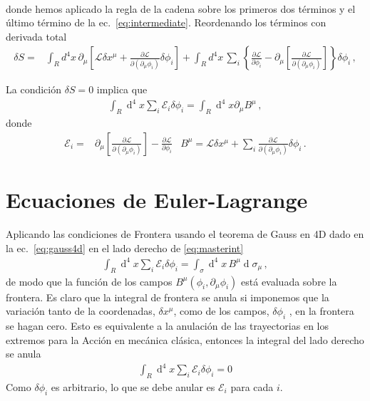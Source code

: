 \begin{frame}
\begin{align}
\end{align}
donde hemos aplicado la regla de la cadena sobre los primeros dos términos y el último término de la ec.~\eqref{eq:intermediate}.
Reordenando los términos con derivada total
\begin{align}
  \delta S =&
\int_{R} d^4x\,\partial_{\mu} \left[\mathcal{L} \delta x^{\mu} + \frac{\partial\mathcal{L}}{\partial(\partial_{\mu}\phi_i)}\delta\phi_{i} \right]  + \int_{R}d^4x\,\sum_i \left\{ \frac{\partial\mathcal{L}}{\partial\phi_i} -\partial_{\mu} \left[ \frac{\partial\mathcal{L}}{\partial(\partial_{\mu}\phi_i)}\right]  \right\}\delta\phi_{i}\,,              
\end{align}
\end{frame}

\begin{frame}
La condición $\delta S=0$ implica que
\begin{align}
\label{eq:masterint}
\int_R \operatorname{d}^4x  \sum_i \mathcal{E}_i \delta\phi_i =\int_R \operatorname{d}^4x  \partial_{\mu} B^{\mu}\,,
\end{align}
donde
\begin{align}
\label{eq:master2}
  \mathcal{E}_i=&\partial_{\mu} \left[ \frac{\partial\mathcal{L}}{\partial(\partial_{\mu}\phi_i)}\right]-\frac{\partial\mathcal{L}}{\partial\phi_i} & B^{\mu}=\mathcal{L} \delta x^{\mu} +\sum_i \frac{\partial\mathcal{L}}{\partial(\partial_{\mu}\phi_i)}\delta\phi_{i}\,. 
\end{align}
\end{frame}


\section{Ecuaciones de Euler-Lagrange}


Aplicando las condiciones de Frontera usando  el teorema de Gauss en 4D dado en la ec.~\eqref{eq:gauss4d} en el lado derecho de \eqref{eq:masterint}
\begin{align}
\int_R \operatorname{d}^4x  \sum_i \mathcal{E}_i \delta\phi_i =\int_\sigma \operatorname{d}^4x \, B^{\mu}\operatorname{d}\sigma_{\mu}\,,
\end{align}
de modo que la función de los campos $B^{\mu}(\phi_i,\partial_{\mu} \phi_{i})$ está evaluada sobre la frontera.
Es claro que la integral de frontera se anula si imponemos que la variación tanto de la coordenadas, $\delta x^{\mu}$, como de los campos, $\delta \phi_{i}$ , en la frontera se hagan cero. Esto es equivalente a la anulación de las trayectorias en los extremos para la Acción en mecánica clásica, 
entonces la integral del lado derecho se anula 
\begin{align}
\int_R \operatorname{d}^4x  \sum_i \mathcal{E}_i \delta\phi_i =0
\end{align}
Como $\delta\phi_i$ es arbitrario, lo que se debe anular es $\mathcal{E}_i$ para cada $i$.

